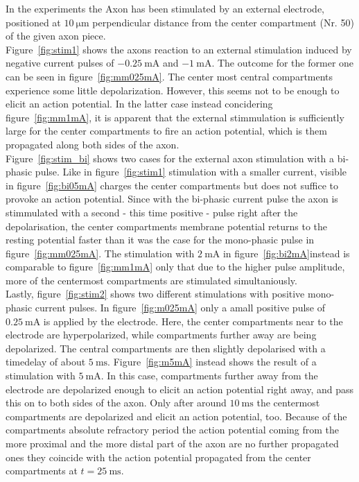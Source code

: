 \documentclass{scrartcl}			%
\begin{document}
In the experiments the Axon has been stimulated by an external electrode, positioned at $\SI{10}{\micro\meter}$ perpendicular distance from the center compartment  (Nr. 50) of the given axon piece.\\ Figure~\ref{fig:stim1} shows the axons reaction to an external stimulation induced by negative current pulses of  $\SI{-0.25}{\milli\ampere}$ and $\SI{-1}{\milli\ampere}$. The outcome for the former one can be seen in figure~\ref{fig:mm025mA}. The center most central compartments experience some little depolarization. However, this seems not to be enough to elicit an action potential. In the latter case instead concidering figure~\ref{fig:mm1mA}, it is apparent that the external stimmulation is sufficiently large for the center compartments to fire an action potential, which is them propagated along both sides of the axon.\\ Figure~\ref{fig:stim_bi} shows two cases for the external axon stimulation with a bi-phasic pulse. Like in figure~\ref{fig:stim1} stimulation with a smaller current, visible in figure~\ref{fig:bi05mA} charges the center compartments but does not suffice to provoke an action potential. Since with the bi-phasic current pulse the axon is stimmulated with a second - this time positive - pulse right after the depolarisation, the center compartments membrane potential returns to the resting potential faster than it was the case for the mono-phasic pulse in figure~\ref{fig:mm025mA}. The stimulation with $\SI{2}{\milli\ampere}$ in figure~\ref{fig:bi2mA}instead is comparable to figure~\ref{fig:mm1mA} only that due to the higher pulse amplitude, more of the centermost compartments are stimulated simultaniously.\\ 
Lastly, figure~\ref{fig:stim2} shows two different stimulations with positive mono-phasic current pulses. In figure~\ref{fig:m025mA} only a amall positive pulse of $\SI{0.25}{\milli\ampere}$ is applied by the electrode. Here, the center compartments near to the electrode are hyperpolarized, while compartments further away are being depolarized. The central compartments are then slightly depolarised with a timedelay of about $\SI{5}{\milli\second}$. Figure~\ref{fig:m5mA} instead shows the result of a stimulation with $\SI{5}{\milli\ampere}$. In this case, compartments further away from the electrode are depolarized enough to elicit an action potential right away, and pass this on to both sides of the axon. Only after around $\SI{10}{\milli\second}$ the centermost compartments are depolarized and elicit an action potential, too. Because of the compartments absolute refractory period the action potential coming from the more proximal and the more distal part of the axon are no further propagated ones they coincide with the action potential propagated from the center compartments at $t=\SI{25}{\milli\second}$.
\end{document}
